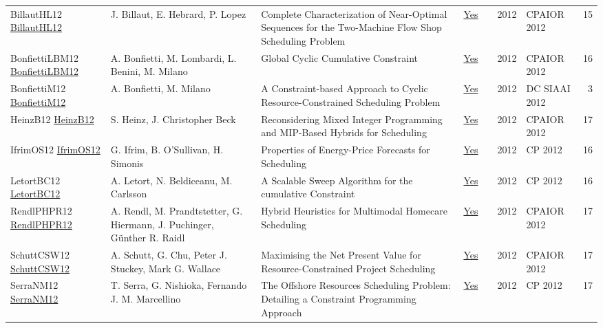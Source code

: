 {\begin{longtable}{p{3cm}p{6cm}p{7cm}rrrp{3cm}r}
BillautHL12 \href{https://doi.org/10.1007/978-3-642-29828-8\_5}{BillautHL12} & J. Billaut, E. Hebrard, P. Lopez & Complete Characterization of Near-Optimal Sequences for the Two-Machine Flow Shop Scheduling Problem & \href{papers/BillautHL12.pdf}{Yes} & \cite{BillautHL12} & 2012 & CPAIOR 2012 & 15\\
BonfiettiLBM12 \href{https://doi.org/10.1007/978-3-642-29828-8\_6}{BonfiettiLBM12} & A. Bonfietti, M. Lombardi, L. Benini, M. Milano & Global Cyclic Cumulative Constraint & \href{papers/BonfiettiLBM12.pdf}{Yes} & \cite{BonfiettiLBM12} & 2012 & CPAIOR 2012 & 16\\
BonfiettiM12 \href{https://ceur-ws.org/Vol-926/paper2.pdf}{BonfiettiM12} & A. Bonfietti, M. Milano & A Constraint-based Approach to Cyclic Resource-Constrained Scheduling Problem & \href{papers/BonfiettiM12.pdf}{Yes} & \cite{BonfiettiM12} & 2012 & DC SIAAI 2012 & 3\\
HeinzB12 \href{https://doi.org/10.1007/978-3-642-29828-8\_14}{HeinzB12} & S. Heinz, J. Christopher Beck & Reconsidering Mixed Integer Programming and MIP-Based Hybrids for Scheduling & \href{papers/HeinzB12.pdf}{Yes} & \cite{HeinzB12} & 2012 & CPAIOR 2012 & 17\\
IfrimOS12 \href{https://doi.org/10.1007/978-3-642-33558-7\_68}{IfrimOS12} & G. Ifrim, B. O'Sullivan, H. Simonis & Properties of Energy-Price Forecasts for Scheduling & \href{papers/IfrimOS12.pdf}{Yes} & \cite{IfrimOS12} & 2012 & CP 2012 & 16\\
LetortBC12 \href{https://doi.org/10.1007/978-3-642-33558-7\_33}{LetortBC12} & A. Letort, N. Beldiceanu, M. Carlsson & A Scalable Sweep Algorithm for the cumulative Constraint & \href{papers/LetortBC12.pdf}{Yes} & \cite{LetortBC12} & 2012 & CP 2012 & 16\\
RendlPHPR12 \href{https://doi.org/10.1007/978-3-642-29828-8\_22}{RendlPHPR12} & A. Rendl, M. Prandtstetter, G. Hiermann, J. Puchinger, G{\"{u}}nther R. Raidl & Hybrid Heuristics for Multimodal Homecare Scheduling & \href{papers/RendlPHPR12.pdf}{Yes} & \cite{RendlPHPR12} & 2012 & CPAIOR 2012 & 17\\
SchuttCSW12 \href{https://doi.org/10.1007/978-3-642-29828-8\_24}{SchuttCSW12} & A. Schutt, G. Chu, Peter J. Stuckey, Mark G. Wallace & Maximising the Net Present Value for Resource-Constrained Project Scheduling & \href{papers/SchuttCSW12.pdf}{Yes} & \cite{SchuttCSW12} & 2012 & CPAIOR 2012 & 17\\
SerraNM12 \href{https://doi.org/10.1007/978-3-642-33558-7\_59}{SerraNM12} & T. Serra, G. Nishioka, Fernando J. M. Marcellino & The Offshore Resources Scheduling Problem: Detailing a Constraint Programming Approach & \href{papers/SerraNM12.pdf}{Yes} & \cite{SerraNM12} & 2012 & CP 2012 & 17\\

\end{longtable}}
